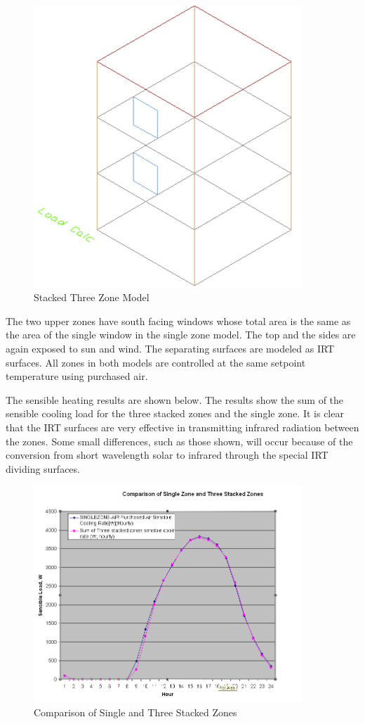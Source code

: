 \begin{figure}[hbtp] %
\centering
\includegraphics[width=0.9\textwidth, height=0.9\textheight, keepaspectratio=true]{media/image397.png}
\caption{Stacked Three Zone Model \protect \label{fig:stacked-three-zone-model}}
\end{figure}

The two upper zones have south facing windows whose total area is the same as the area of the single window in the single zone model. The top and the sides are again exposed to sun and wind. The separating surfaces are modeled as IRT surfaces. All zones in both models are controlled at the same setpoint temperature using purchased air.

The sensible heating results are shown below. The results show the sum of the sensible cooling load for the three stacked zones and the single zone. It is clear that the IRT surfaces are very effective in transmitting infrared radiation between the zones. Some small differences, such as those shown, will occur because of the conversion from short wavelength solar to infrared through the special IRT dividing surfaces.

\begin{figure}[hbtp] %
\centering
\includegraphics[width=0.9\textwidth, height=0.9\textheight, keepaspectratio=true]{media/image398.png}
\caption{Comparison of Single and Three Stacked Zones \protect \label{fig:comparison-of-single-and-three-stacked-zones}}
\end{figure}

